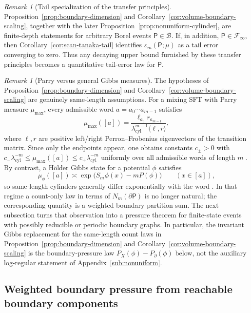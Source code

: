 \documentclass{etds}%
\numberwithin{equation}{section}
\theoremstyle{plain}
\theoremstyle{definition}
\theoremstyle{remark}
\newtheorem{remark}[theorem]{Remark}
\begin{document}
\begin{remark}[Tail specialization of the transfer principles]
\label{rem:tail-specialization-transfer}
Proposition~\ref{prop:boundary-dimension}
and Corollary~\ref{cor:volume-boundary-scaling}, together with the later
Proposition~\ref{prop:nonuniform-cylinder}, are finite-depth statements for
arbitrary Borel events $\mathsf{P}\in\mathcal{B}$.  If, in addition,
$\mathsf{P}\in\mathcal{F}_\infty$, then Corollary~\ref{cor:scan-tanaka-tail}
identifies $\varepsilon_m(\mathsf{P};\mu)$ as a tail error converging to zero.
Thus any decaying upper bound furnished by these transfer principles becomes a
quantitative tail-error law for $\mathsf{P}$.
\end{remark}

\begin{remark}[Parry versus general Gibbs measures]
\label{rem:parry-vs-gibbs}
The hypotheses of Proposition~\ref{prop:boundary-dimension}
and Corollary~\ref{cor:volume-boundary-scaling} are genuinely same-length
assumptions.
For a mixing SFT with Parry measure $\mu_{\max}$, every admissible word
$a=a_0\cdots a_{m-1}$ satisfies
\[
\mu_{\max}([a])
=\frac{\ell_{a_0}r_{a_{m-1}}}{\lambda_{\mathrm{cyl}}^{m-1}\langle \ell,r\rangle},
\]
where $\ell,r$ are positive left/right Perron--Frobenius eigenvectors of the
transition matrix.  Since only the endpoints appear, one obtains constants
$c_\pm>0$ with $c_-\lambda_{\mathrm{cyl}}^{-m}\le\mu_{\max}([a])\le
c_+\lambda_{\mathrm{cyl}}^{-m}$ uniformly over all admissible words of length
$m$ \cite{Parry1964}.  By contrast, a H\"older Gibbs state for a potential
$\phi$ satisfies
\[
\mu_\phi([a])\asymp \exp\!\bigl(S_m\phi(x)-mP(\phi)\bigr)
\qquad(x\in[a]),
\]
so same-length cylinders generally differ exponentially with the word
\cite{Ruelle1978,ParryPollicott1990,Baladi2000,Bowen1975,WaltersErgodicTheory}.  In that regime a count-only law in
terms of $N_m(\partial\mathsf{P})$ is no longer natural; the corresponding
quantity is a weighted boundary partition sum.  The next subsection turns that
observation into a pressure theorem for finite-state events with possibly
reducible or periodic boundary graphs.  In
particular, the invariant Gibbs replacement for the same-length count laws in
Proposition~\ref{prop:boundary-dimension}
and Corollary~\ref{cor:volume-boundary-scaling} is the boundary-pressure law
$P_X(\phi)-P_\partial(\phi)$ below, not the auxiliary log-regular statement of
Appendix~\ref{sub:nonuniform}.
\end{remark}

\subsection{Weighted boundary pressure from reachable boundary components}
\label{sub:weighted-pressure}
\end{document}

